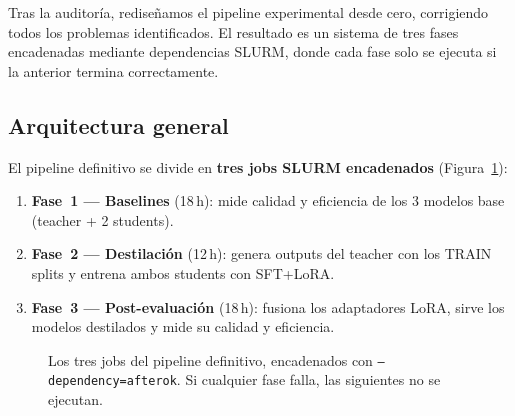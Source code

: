 \documentclass[11pt,a4paper]{article}
\begin{document}
Tras la auditor\'ia, redise\~namos el pipeline experimental desde cero,
corrigiendo todos los problemas identificados. El resultado es un
sistema de tres fases encadenadas mediante dependencias SLURM, donde
cada fase solo se ejecuta si la anterior termina correctamente.

\subsection{Arquitectura general}

El pipeline definitivo se divide en \textbf{tres jobs SLURM encadenados}
(Figura~\ref{fig:pipeline-def}):

\begin{enumerate}
  \item \textbf{Fase~1 --- Baselines} (18\,h): mide calidad y eficiencia
    de los 3 modelos base (teacher + 2 students).
  \item \textbf{Fase~2 --- Destilaci\'on} (12\,h): genera outputs del
    teacher con los TRAIN splits y entrena ambos students con SFT+LoRA.
  \item \textbf{Fase~3 --- Post-evaluaci\'on} (18\,h): fusiona los
    adaptadores LoRA, sirve los modelos destilados y mide su calidad y
    eficiencia.
\end{enumerate}

\begin{figure}[H]
\centering
{}
\caption{Los tres jobs del pipeline definitivo, encadenados con
\texttt{--dependency=afterok}. Si cualquier fase falla, las siguientes
no se ejecutan.}
\label{fig:pipeline-def}
\end{figure}
\end{document}
